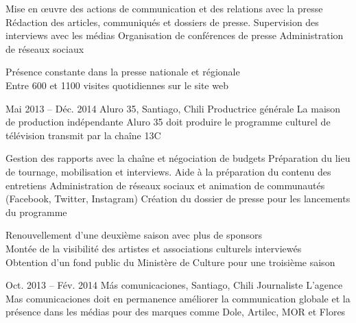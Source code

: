 \documentclass[30pt, french]{tccv}
\begin{document}
\begin{upshape}
\begin{textblock}{13.3}
\begin{mdframed}
\begin{eventlist}
    \setlength{\parskip}{-10pt}
    \begin{itemize}
      \setlength\itemsep{-3pt} 
      \cvitem[\checkmark] Mise en œuvre des actions de communication et des relations avec la presse
      \cvitem[\checkmark] Rédaction des articles, communiqués et dossiers de presse. Supervision des interviews avec les médias
      \cvitem[\checkmark] Organisation de conférences de presse
      \cvitem[\checkmark] Administration de réseaux sociaux
    \end{itemize}     
     Présence constante dans la presse nationale et régionale  \\
    \makebox[1.4cm][l]{}          Entre 600 et 1100 visites quotidiennes sur le site web 
               
\setlength{\parskip}{0pt}        
\item{Mai 2013 -- Déc. 2014}
     {Aluro 35, Santiago, Chili}
     {Productrice générale}
     \fontsize{9pt}{1em}\color{text}\bodyfontlight\upshape\selectfont
     La maison de production indépendante Aluro 35 doit produire le programme culturel de télévision  transmit par la chaîne 13C \\
    
    \setlength{\parskip}{-10pt}
    \begin{itemize}
      \setlength\itemsep{-3pt} 
      \cvitem[\checkmark] Gestion des rapports avec la chaîne et négociation de budgets                       
      \cvitem[\checkmark] Préparation du lieu de tournage, mobilisation et interviews. Aide à la préparation du contenu des entretiens 
      \cvitem[\checkmark] Administration de réseaux sociaux et animation de communautés (Facebook, Twitter, Instagram)                 
      \cvitem[\checkmark] Création du dossier de presse pour les lancements du programme                                               
    \end{itemize}     
 Renouvellement d'une deuxième saison avec plus de sponsors \\
\makebox[1.4cm][l]{}	       Montée de la visibilité des artistes et associations culturels interviewés \\
\makebox[1.4cm][l]{}           Obtention d’un fond public du Ministère de Culture pour une troisième saison  \\


\setlength{\parskip}{0pt}    
\item{Oct. 2013 -- Fév. 2014 }     
  {Más comunicaciones, Santiago, Chili}     
  {Journaliste}
     \fontsize{9pt}{1em}\color{text}\bodyfontlight\upshape\selectfont
{} L’agence Mas comunicaciones doit en permanence améliorer la communication globale et la présence dans les médias
pour des marques comme Dole, Artilec, MOR et Flores\\


\end{eventlist}
\end{mdframed}
\end{textblock}
\end{upshape}
\end{document}
